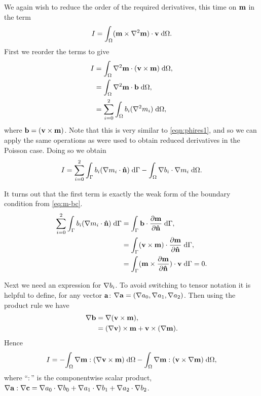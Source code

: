We again wish to reduce the order of the required derivatives, this time on $\mathbf{m}$ in the term
\begin{equation}
  I = {\int_{\Omega}  (\mathbf{m} \times \nabla^2 \mathbf{m}) \cdot \mathbf{v}  {\; \text{d}} {\Omega}}.
  \label{eq:46}
\end{equation}
First we reorder the terms to give
\begin{equation}
  \begin{aligned}
    I &= {\int_{\Omega} \nabla^2 \mathbf{m} \cdot (\mathbf{v} \times \mathbf{m}) {\; \text{d}} {\Omega}}, \\
      &= {\int_{\Omega} \nabla^2 \mathbf{m} \cdot {\mathbf{b}} {\; \text{d}} {\Omega}}, \\
      &= \sum_{i=0}^2 {\int_{\Omega}  b_i (\nabla^2 m_i) {\; \text{d}} {\Omega}},
  \end{aligned}
\end{equation}
where ${\mathbf{b}} = (\mathbf{v} \times \mathbf{m})$.
Note that this is very similar to \eqref{eqn:phires1}, and so we can apply the same operations as were used to obtain reduced derivatives in the Poisson case. 
Doing so we obtain
\begin{equation}
  I = \sum_{i=0}^2 {\int_{{\Gamma}} b_i (\nabla m_i \cdot \mathbf{\hat{n}}) {\; \text{d}} {{\Gamma}}} - {\int_{\Omega} \nabla b_i \cdot \nabla m_i {\; \text{d}} {\Omega}}.
\end{equation}

It turns out that the first term is exactly the weak form of the boundary condition from \eqref{eq:m-bc}.
\begin{equation}
  \begin{aligned}
    \sum_{i=0}^2 {\int_{{\Gamma}} b_i (\nabla m_i \cdot \mathbf{\hat{n}}) {\; \text{d}} {{\Gamma}}} 
    &= {\int_{{\Gamma}} {\mathbf{b}} \cdot \frac{\partial \mathbf{m}}{\partial \mathbf{\hat{n}}} {\; \text{d}} {{\Gamma}}}, \\
    &=  {\int_{{\Gamma}} (\mathbf{v} \times \mathbf{m}) \cdot \frac{\partial \mathbf{m}}{\partial \mathbf{\hat{n}}} {\; \text{d}} {{\Gamma}}}, \\
    &=  {\int_{{\Gamma}} (\mathbf{m} \times \frac{\partial \mathbf{m}}{\partial \mathbf{\hat{n}}}) \cdot \mathbf{v} {\; \text{d}} {{\Gamma}}} = 0 .
  \end{aligned}
\end{equation}

Next we need an expression for $\nabla b_i$.
To avoid switching to tensor notation it is helpful to define, for any vector ${\mathbf{a}}$: $\nabla {\mathbf{a}} = (\nabla a_0, \nabla a_1, \nabla a_2)$.
Then using the product rule we have
\begin{equation}
  \begin{aligned}
    \nabla {\mathbf{b}} &= \nabla {\left( \mathbf{v}\times \mathbf{m}\right)}, \\
    & = (\nabla \mathbf{v}) \times \mathbf{m} + \mathbf{v} \times (\nabla \mathbf{m}).
  \end{aligned}
\end{equation}
Hence
\begin{equation}
  I = - {\int_{\Omega} \nabla \mathbf{m} : {\left( \nabla \mathbf{v} \times \mathbf{m} \right)} {\; \text{d}} {\Omega}} 
      - {\int_{\Omega} \nabla \mathbf{m} : {\left( \mathbf{v} \times \nabla \mathbf{m} \right)} {\; \text{d}} {\Omega}},
      \label{eq:72}
\end{equation}
where ``$:$'' is the componentwise scalar product, \eg $\nabla {\mathbf{a}} : \nabla {\mathbf{c}} = \nabla a_0 \cdot \nabla b_0 + \nabla a_1 \cdot \nabla b_1 + \nabla a_2 \cdot \nabla b_2$.

